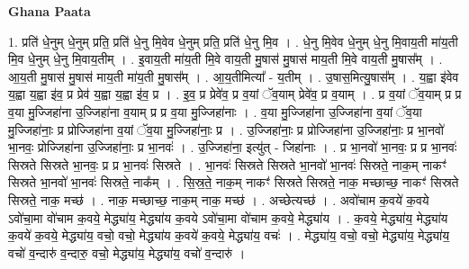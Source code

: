 \documentclass[17pt]{extarticle}
\begin{document}
\textbf{Ghana Paata } \newline

1. प्रति॑ धे॒नुम् धे॒नुम् प्रति॒ प्रति॑ धे॒नु मि॒वेव धे॒नुम् प्रति॒ प्रति॑ धे॒नु मि॒व । . धे॒नु मि॒वेव धे॒नुम् धे॒नु मि॒वाय॒ती मा॑य॒ती मि॒व धे॒नुम् धे॒नु मि॒वाय॒तीम् । . इ॒वाय॒ती मा॑य॒ती मि॒वे वाय॒ती मु॒षास॑ मु॒षास॑ माय॒ती मि॒वे वाय॒ती मु॒षास᳚म् । . आ॒य॒ती मु॒षास॑ मु॒षास॑ माय॒ती मा॑य॒ती मु॒षास᳚म् । . आ॒य॒तीमित्या᳚ - य॒तीम् । . उ॒षास॒मित्यु॒षास᳚म् । . य॒ह्वा इ॑वेव य॒ह्वा य॒ह्वा इ॑व॒ प्र प्रेव॑ य॒ह्वा य॒ह्वा इ॑व॒ प्र । . इ॒व॒ प्र प्रेवे॑व॒ प्र व॒यां ॅव॒याम् प्रेवे॑व॒ प्र व॒याम् । . प्र व॒यां ॅव॒याम् प्र प्र व॒या मु॒ज्जिहा॑ना उ॒ज्जिहा॑ना व॒याम् प्र प्र व॒या मु॒ज्जिहा॑नाः । . व॒या मु॒ज्जिहा॑ना उ॒ज्जिहा॑ना व॒यां ॅव॒या मु॒ज्जिहा॑नाः॒ प्र प्रोज्जिहा॑ना व॒यां ॅव॒या मु॒ज्जिहा॑नाः॒ प्र । . उ॒ज्जिहा॑नाः॒ प्र प्रोज्जिहा॑ना उ॒ज्जिहा॑नाः॒ प्र भा॒नवो॑ भा॒नवः॒ प्रोज्जिहा॑ना उ॒ज्जिहा॑नाः॒ प्र भा॒नवः॑ । . उ॒ज्जिहा॑ना॒ इत्यु॑त् - जिहा॑नाः । . प्र भा॒नवो॑ भा॒नवः॒ प्र प्र भा॒नवः॑ सिस्रते सिस्रते भा॒नवः॒ प्र प्र भा॒नवः॑ सिस्रते । . भा॒नवः॑ सिस्रते सिस्रते भा॒नवो॑ भा॒नवः॑ सिस्रते॒ नाक॒म् नाकꣳ॑ सिस्रते भा॒नवो॑ भा॒नवः॑ सिस्रते॒ नाक᳚म् । . सि॒स्र॒ते॒ नाक॒म् नाकꣳ॑ सिस्रते सिस्रते॒ नाक॒ मच्छाच्छ॒ नाकꣳ॑ सिस्रते सिस्रते॒ नाक॒ मच्छ॑ । . नाक॒ मच्छाच्छ॒ नाक॒म् नाक॒ मच्छ॑ । . अच्छेत्यच्छ॑ । . अवो॑चाम क॒वये॑ क॒वये ऽवो॑चा॒मा वो॑चाम क॒वये॒ मेद्ध्या॑य॒ मेद्ध्या॑य क॒वये ऽवो॑चा॒मा वो॑चाम क॒वये॒ मेद्ध्या॑य । . क॒वये॒ मेद्ध्या॑य॒ मेद्ध्या॑य क॒वये॑ क॒वये॒ मेद्ध्या॑य॒ वचो॒ वचो॒ मेद्ध्या॑य क॒वये॑ क॒वये॒ मेद्ध्या॑य॒ वचः॑ । . मेद्ध्या॑य॒ वचो॒ वचो॒ मेद्ध्या॑य॒ मेद्ध्या॑य॒ वचो॑ व॒न्दारु॑ व॒न्दारु॒ वचो॒ मेद्ध्या॑य॒ मेद्ध्या॑य॒ वचो॑ व॒न्दारु॑ । \newline
\end{document}
